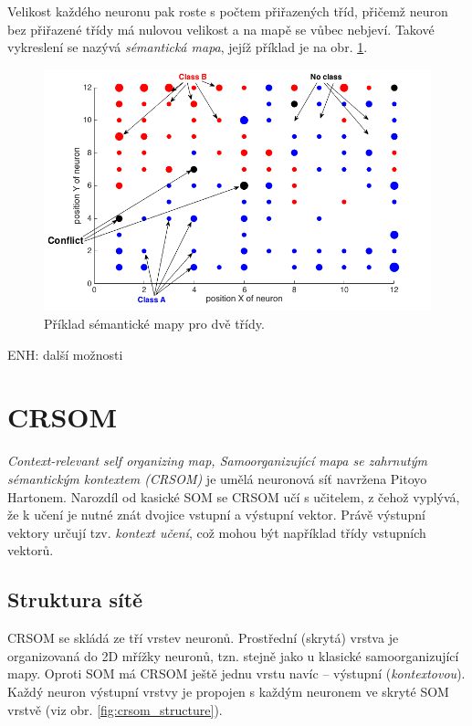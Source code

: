 \documentclass[thesis=M,czech]{FITthesis}[2012/06/26]
\begin{document}
Velikost každého neuronu pak roste s počtem přiřazených tříd, přičemž neuron bez přiřazené třídy má nulovou velikost a na mapě se vůbec nebjeví. Takové vykreslení se nazývá \textit{sémantická mapa}, jejíž příklad je na obr. \ref{fig:semanticmap}.


\begin{figure}[htbp]
\begin{center}
	\includegraphics[scale=0.4]{semantic_map.png}
\caption{Příklad sémantické mapy pro dvě třídy.}
\label{fig:semanticmap}
\end{center}
\end{figure}


ENH: další možnosti



\section{CRSOM}\label{sec:crsom_teo}
\textit{Context-relevant self organizing map, Samoorganizující mapa se zahrnutým sémantickým kontextem (CRSOM)} je umělá neuronová síť navržena Pitoyo Hartonem. Narozdíl od kasické SOM se CRSOM učí s učitelem, z čehož vyplývá, že k učení je nutné znát dvojice vstupní a výstupní vektor. Právě výstupní vektory určují tzv. \textit{kontext učení}, což mohou být například třídy vstupních vektorů.

\subsection{Struktura sítě}
CRSOM se skládá ze tří vrstev neuronů. Prostřední (skrytá) vrstva je organizovaná do 2D mřížky neuronů, tzn. stejně jako u klasické samoorganizující mapy.
 Oproti SOM má CRSOM ještě jednu vrstu navíc -- výstupní (\textit{kontextovou}).  Každý neuron výstupní vrstvy je propojen s každým neuronem ve skryté SOM vrstvě (viz obr. \ref{fig:crsom_structure}). 
 
\end{document}
